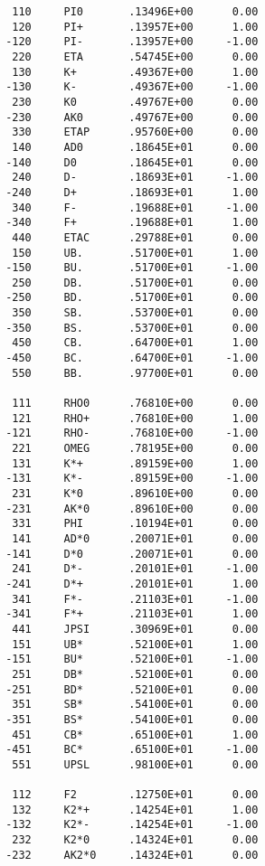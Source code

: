 \begin{verbatim}
        110     PI0       .13496E+00      0.00
        120     PI+       .13957E+00      1.00
       -120     PI-       .13957E+00     -1.00
        220     ETA       .54745E+00      0.00
        130     K+        .49367E+00      1.00
       -130     K-        .49367E+00     -1.00
        230     K0        .49767E+00      0.00
       -230     AK0       .49767E+00      0.00
        330     ETAP      .95760E+00      0.00
        140     AD0       .18645E+01      0.00
       -140     D0        .18645E+01      0.00
        240     D-        .18693E+01     -1.00
       -240     D+        .18693E+01      1.00
        340     F-        .19688E+01     -1.00
       -340     F+        .19688E+01      1.00
        440     ETAC      .29788E+01      0.00
        150     UB.       .51700E+01      1.00
       -150     BU.       .51700E+01     -1.00
        250     DB.       .51700E+01      0.00
       -250     BD.       .51700E+01      0.00
        350     SB.       .53700E+01      0.00
       -350     BS.       .53700E+01      0.00
        450     CB.       .64700E+01      1.00
       -450     BC.       .64700E+01     -1.00
        550     BB.       .97700E+01      0.00

        111     RHO0      .76810E+00      0.00
        121     RHO+      .76810E+00      1.00
       -121     RHO-      .76810E+00     -1.00
        221     OMEG      .78195E+00      0.00
        131     K*+       .89159E+00      1.00
       -131     K*-       .89159E+00     -1.00
        231     K*0       .89610E+00      0.00
       -231     AK*0      .89610E+00      0.00
        331     PHI       .10194E+01      0.00
        141     AD*0      .20071E+01      0.00
       -141     D*0       .20071E+01      0.00
        241     D*-       .20101E+01     -1.00
       -241     D*+       .20101E+01      1.00
        341     F*-       .21103E+01     -1.00
       -341     F*+       .21103E+01      1.00
        441     JPSI      .30969E+01      0.00
        151     UB*       .52100E+01      1.00
       -151     BU*       .52100E+01     -1.00
        251     DB*       .52100E+01      0.00
       -251     BD*       .52100E+01      0.00
        351     SB*       .54100E+01      0.00
       -351     BS*       .54100E+01      0.00
        451     CB*       .65100E+01      1.00
       -451     BC*       .65100E+01     -1.00
        551     UPSL      .98100E+01      0.00

        112     F2        .12750E+01      0.00
        132     K2*+      .14254E+01      1.00
       -132     K2*-      .14254E+01     -1.00
        232     K2*0      .14324E+01      0.00
       -232     AK2*0     .14324E+01      0.00


\end{verbatim}
